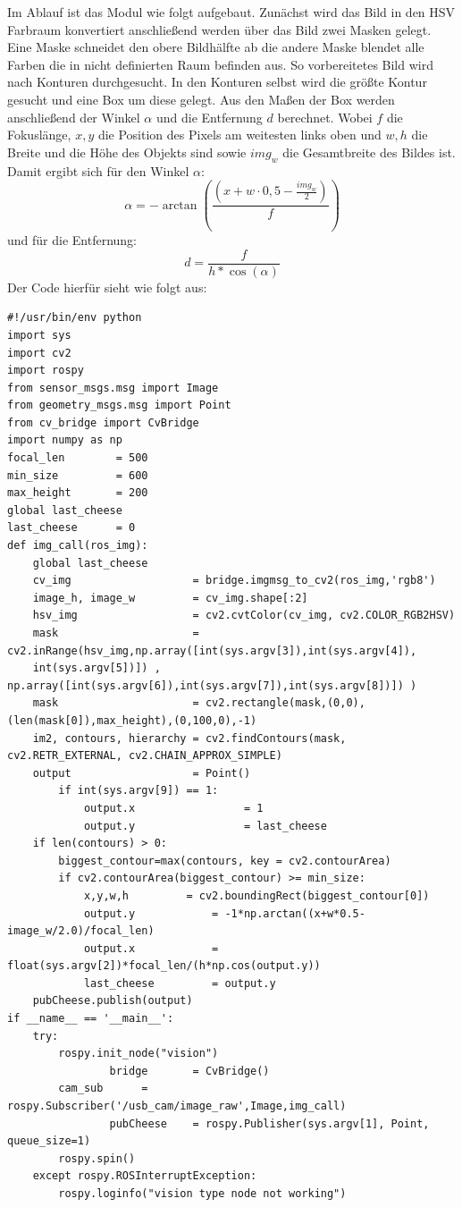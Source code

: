 \documentclass[11pt,a4paper]{article}
\begin{document}
 Im Ablauf ist das Modul wie folgt aufgebaut. Zunächst wird das Bild in den HSV Farbraum konvertiert anschließend werden über das Bild zwei Masken gelegt. Eine Maske schneidet den obere Bildhälfte ab die andere Maske blendet alle Farben die in nicht definierten Raum befinden aus. So vorbereitetes Bild wird nach Konturen durchgesucht. In den Konturen selbst wird die größte Kontur gesucht und eine Box um diese gelegt. Aus den Maßen der Box werden anschließend der Winkel $\alpha$ und die Entfernung $d$ berechnet. Wobei $f$ die Fokuslänge, $x,y$ die Position des Pixels am weitesten links oben und $w,h$ die Breite und die Höhe des Objekts sind sowie $img_w$ die Gesamtbreite des Bildes ist. Damit ergibt sich für den Winkel $\alpha$:
\begin{equation}
\alpha = -\arctan(\frac{(x+w\cdot 0,5-\frac{img_w}{2})}{f})
\end{equation}   
und für die Entfernung:
\begin{equation}
d=\frac{f}{h*\cos(\alpha)}
\end{equation}
Der Code hierfür sieht wie folgt aus:
\begin{tiny}
\begin{lstlisting}
#!/usr/bin/env python
import sys
import cv2
import rospy
from sensor_msgs.msg import Image
from geometry_msgs.msg import Point
from cv_bridge import CvBridge
import numpy as np
focal_len        = 500
min_size         = 600
max_height       = 200
global last_cheese
last_cheese      = 0
def img_call(ros_img):
	global last_cheese
	cv_img                   = bridge.imgmsg_to_cv2(ros_img,'rgb8')
	image_h, image_w         = cv_img.shape[:2]
	hsv_img                  = cv2.cvtColor(cv_img, cv2.COLOR_RGB2HSV)
	mask                     = cv2.inRange(hsv_img,np.array([int(sys.argv[3]),int(sys.argv[4]),
	int(sys.argv[5])]) , np.array([int(sys.argv[6]),int(sys.argv[7]),int(sys.argv[8])]) )
	mask                     = cv2.rectangle(mask,(0,0),(len(mask[0]),max_height),(0,100,0),-1)
	im2, contours, hierarchy = cv2.findContours(mask, cv2.RETR_EXTERNAL, cv2.CHAIN_APPROX_SIMPLE)
	output                   = Point()
        if int(sys.argv[9]) == 1:
            output.x                 = 1
            output.y                 = last_cheese
	if len(contours) > 0:
		biggest_contour=max(contours, key = cv2.contourArea)
		if cv2.contourArea(biggest_contour) >= min_size:
			x,y,w,h         = cv2.boundingRect(biggest_contour[0])
			output.y            = -1*np.arctan((x+w*0.5-image_w/2.0)/focal_len)
			output.x            = float(sys.argv[2])*focal_len/(h*np.cos(output.y))
			last_cheese         = output.y
	pubCheese.publish(output)
if __name__ == '__main__':
	try:
		rospy.init_node("vision")
                bridge       = CvBridge()
		cam_sub      = rospy.Subscriber('/usb_cam/image_raw',Image,img_call)
                pubCheese    = rospy.Publisher(sys.argv[1], Point, queue_size=1)
		rospy.spin()
	except rospy.ROSInterruptException:
		rospy.loginfo("vision type node not working")

\end{lstlisting}

\end{tiny}
\newpage
\end{document}
